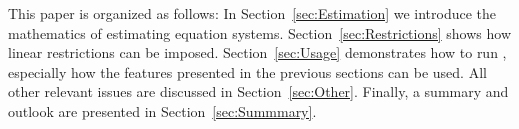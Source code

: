 This paper is organized as follows: In Section~\ref{sec:Estimation} we
introduce the mathematics of estimating equation systems.
Section~\ref{sec:Restrictions} shows how linear restrictions can be
imposed.
Section~\ref{sec:Usage} demonstrates how to run
, especially how the features presented in the previous
sections can be used.
All other relevant issues are discussed in Section~\ref{sec:Other}.
Finally, a summary and outlook are presented in
Section~\ref{sec:Summmary}.



